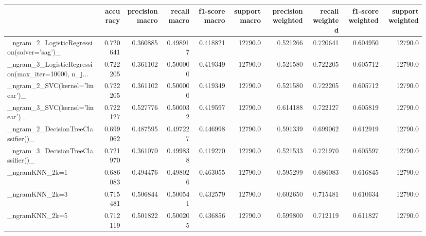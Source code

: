 \begin{tabular}{lrrrrrrrrr}
\toprule
{} &  accuracy &  precision macro &  recall macro &  f1-score macro &  support macro &  precision weighted &  recall weighted &  f1-score weighted &  support weighted \\
\midrule
\_ngram\_2\_LogisticRegression(solver='sag')\_         &  0.720641 &         0.360885 &      0.498917 &        0.418821 &        12790.0 &            0.521266 &         0.720641 &           0.604950 &           12790.0 \\
\_ngram\_3\_LogisticRegression(max\_iter=10000, n\_j... &  0.722205 &         0.361102 &      0.500000 &        0.419349 &        12790.0 &            0.521580 &         0.722205 &           0.605712 &           12790.0 \\
\_ngram\_2\_SVC(kernel='linear')\_                     &  0.722205 &         0.361102 &      0.500000 &        0.419349 &        12790.0 &            0.521580 &         0.722205 &           0.605712 &           12790.0 \\
\_ngram\_3\_SVC(kernel='linear')\_                     &  0.722127 &         0.527776 &      0.500032 &        0.419597 &        12790.0 &            0.614188 &         0.722127 &           0.605819 &           12790.0 \\
\_ngram\_2\_DecisionTreeClassifier()\_                 &  0.699062 &         0.487595 &      0.497227 &        0.446998 &        12790.0 &            0.591339 &         0.699062 &           0.612919 &           12790.0 \\
\_ngram\_3\_DecisionTreeClassifier()\_                 &  0.721970 &         0.361070 &      0.499838 &        0.419270 &        12790.0 &            0.521533 &         0.721970 &           0.605597 &           12790.0 \\
\_ngramKNN\_2k=1                                     &  0.686083 &         0.494476 &      0.498026 &        0.463055 &        12790.0 &            0.595299 &         0.686083 &           0.616845 &           12790.0 \\
\_ngramKNN\_2k=3                                     &  0.715481 &         0.506844 &      0.500541 &        0.432579 &        12790.0 &            0.602650 &         0.715481 &           0.610634 &           12790.0 \\
\_ngramKNN\_2k=5                                     &  0.712119 &         0.501822 &      0.500205 &        0.436856 &        12790.0 &            0.599800 &         0.712119 &           0.611827 &           12790.0 \\

\end{tabular}
